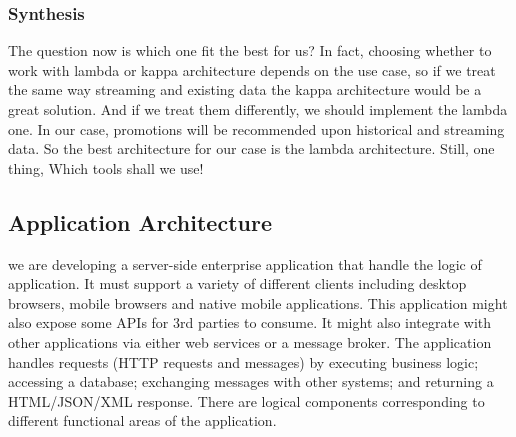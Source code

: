 \subsubsection{Synthesis}
\label{subsec:subsec01}
The question now is which one fit the best for us? In fact, choosing whether to work with lambda or kappa architecture depends on the use case, 
so if we treat the same way streaming and existing data the kappa architecture would be a great solution. And if we treat them differently, 
we should implement the lambda one. In our case, promotions will be recommended upon historical and streaming data. So the best architecture for 
our case is the lambda architecture. Still, one thing, Which tools shall we use!


\subsection{Application Architecture}
\label{subsec:subsec01}
we are developing a server-side enterprise application that handle the logic of application. 
It must support a variety of different clients including desktop browsers, mobile browsers and native mobile applications.
 This application might also expose some APIs for 3rd parties to consume. It might also integrate with other applications via either web services 
 or a message broker. The application handles requests (HTTP requests and messages) by executing business logic; 
 accessing a database; exchanging messages with other systems; and returning a HTML/JSON/XML response.
  There are logical components corresponding to different functional areas of the application.

